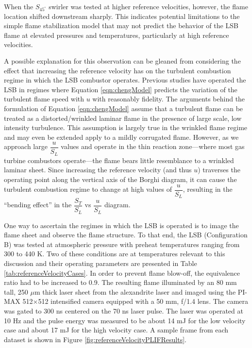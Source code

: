 When the \(S_{45^\circ}\) swirler was tested at higher reference velocities, however, the flame location shifted downstream sharply.
This indicates potential limitations to the simple flame stabilization model that may not predict the behavior of the LSB flame at elevated pressures and temperatures, particularly at high reference velocities.

A possible explanation for this observation can be gleaned from considering the effect that increasing the reference velocity has on the turbulent combustion regime in which the LSB combustor operates.
Previous studies have operated the LSB in regimes where Equation \ref{eqn:chengModel} predicts the variation of the turbulent flame speed with \(u\) with reasonably fidelity.
The arguments behind the formulation of Equation \ref{eqn:chengModel} assume that a turbulent flame can be treated as a distorted/wrinkled laminar flame in the presence of large scale, low intensity turbulence.
This assumption is largely true in the wrinkled flame regime and may even be extended apply to a mildly corrugated flame.
However, as we approach large \(\dfrac{ u }{ S_L }\) values and operate in the thin reaction zone---where most gas turbine combustors operate---the flame bears little resemblance to a wrinkled laminar sheet.
Since increasing the reference velocity (and thus \(u\)) traverses the operating point along the vertical axis of the Borghi diagram, it can cause the turbulent combustion regime to change at high values of \(\dfrac{ u }{ S_L }\), resulting in the ``bending effect'' in the \(\dfrac{ S_T }{ S_L }\) vs \(\dfrac{ u }{ S_L }\) diagram.\cite{1996-kobayashi,2006-law}

One way to ascertain the regimes in which the LSB is operated is to image the flame sheet and observe the flame structure.
To that end, the LSB (Configuration B) was tested at atmospheric pressure with preheat temperatures ranging from 300 to 440 K.
Two of these conditions are at temperatures relevant to this discussion and their operating parameters are presented in Table \ref{tab:referenceVelocityCases}.
In order to prevent flame blow-off, the equivalence ratio had to be increased to 0.9.
The resulting flame illuminated by an 80 mm tall, 250 \(\mu\)m thick laser sheet from the alexandrite laser and imaged using the PI-MAX 512\(\times\)512 intensified camera equipped with a 50 mm, f/1.4 lens.
The camera was gated to 300 ns centered on the 70 ns laser pulse.
The laser was operated at 10 Hz and the pulse energy was measured to be about 14 mJ for the low velocity case and about 17 mJ for the high velocity case.
A sample frame from each dataset is shown in Figure \ref{fig:referenceVelocityPLIFResults}. 

